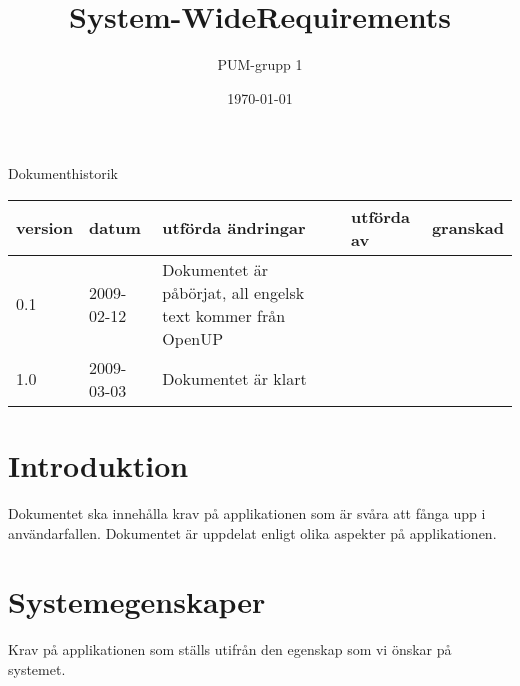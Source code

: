 

\ifpdf
\else
\fi

\title{System-WideRequirements}
\author{PUM-grupp 1}
\date{\today}



\maketitle\thispagestyle{empty}

\newpage

{\centering \Large{Dokumenthistorik\\}}

\vspace{10pt}
\begin{tabularx}{\textwidth}{ |l|l|X|l|l| }
  \hline
    \textbf{version} & \textbf{datum} & \textbf{utförda ändringar} & \textbf{utförda av} & \textbf{granskad} \\
	\hline 
  0.1 & 2009-02-12 &  Dokumentet är påbörjat, all engelsk text kommer från OpenUP & &   \\
  \hline
  1.0 & 2009-03-03 & Dokumentet är klart & & \\
  \hline
\end{tabularx}

\newpage

\setcounter{tocdepth}{2}
\tableofcontents
\newpage

\section{Introduktion}
Dokumentet ska innehålla krav på applikationen som är svåra att fånga upp i användarfallen. Dokumentet är uppdelat enligt olika aspekter på applikationen. 


\section{Systemegenskaper}
Krav på applikationen som ställs utifrån den egenskap som vi önskar på systemet. 


